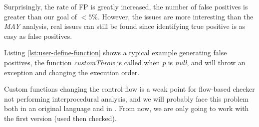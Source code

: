 Surprisingly, the rate of FP is greatly increased, the number of false positives is greater than our goal of $<5\%$.
However, the issues are more interesting than the \emph{MAY} analysis, real issues can still be found since identifying true positive is as easy as false positives.

 

Listing \ref{lst:user-define-function} shows a typical example generating false positives, the function \emph{customThrow} is called when \emph{p} is \emph{null}, and will throw an exception and changing the execution order.

Custom functions changing the control flow is a weak point for flow-based checker not performing interprocedural analysis, and we will probably face this problem both in an original language and in \slang{}. 
From now, we are only going to work with the first version (used then checked).




